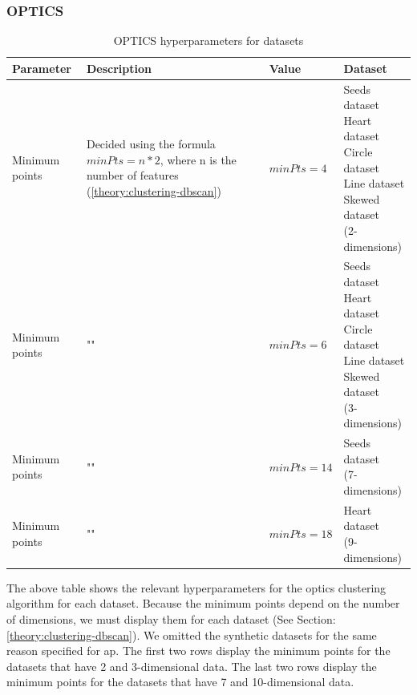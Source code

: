 \subsubsection{OPTICS}

\begin{table}[h]
    \begin{tabular}{|l|p{6cm}|l|l|}
        \hline
        Parameter      & Description                                                                                                    & Value       & Dataset                    \\
        \hline
        Minimum points & Decided using the formula $minPts = n * 2$, where n is the number of features (\ref{theory:clustering-dbscan}) & $minPts=4$  & \makecell[l]{Seeds dataset \\ Heart dataset \\ Circle dataset \\ Line dataset \\ Skewed dataset \\ (2-dimensions)}  \\
        \hline
        Minimum points & ""                                                                                                             & $minPts=6$  & \makecell[l]{Seeds dataset \\ Heart dataset \\ Circle dataset \\ Line dataset \\ Skewed dataset \\ (3-dimensions)} \\
        \hline
        Minimum points & ""                                                                                                             & $minPts=14$ & \makecell[l]{Seeds dataset \\ (7-dimensions)}  \\
        \hline
        Minimum points & ""                                                                                                             & $minPts=18$ & \makecell[l]{Heart dataset \\ (9-dimensions)} \\
        \hline
    \end{tabular}
    \caption{OPTICS  hyperparameters for datasets}
    \label{tab:dbscan-formula-sklearn}
\end{table}
The above table shows the relevant hyperparameters for the \gls{optics} clustering algorithm for each dataset.
Because the minimum points depend on the number of dimensions, we must display them for each dataset (See Section: \ref{theory:clustering-dbscan}).
We omitted the synthetic datasets for the same reason specified for \gls{ap}.
The first two rows display the minimum points for the datasets that have 2 and 3-dimensional data.
The last two rows display the minimum points for the datasets that have 7 and 10-dimensional data.
\newpage

